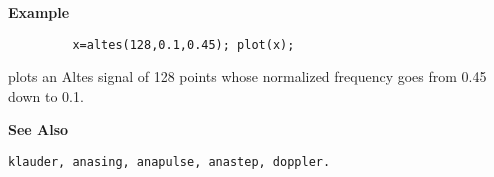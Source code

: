 {\bf \large {}\selectfont Example}\\
\hspace*{1.5cm}
\begin{minipage}[t]{13.5cm}
\begin{verbatim}
         x=altes(128,0.1,0.45); plot(x);
\end{verbatim}
plots an Altes signal of 128 points whose normalized frequency goes from
0.45 down to 0.1.
\end{minipage}
\vspace*{.5cm}


{\bf \large {}\selectfont See Also}\\
\hspace*{1.5cm}
\begin{minipage}[t]{13.5cm}
\begin{verbatim}
klauder, anasing, anapulse, anastep, doppler.
\end{verbatim}
\end{minipage}

